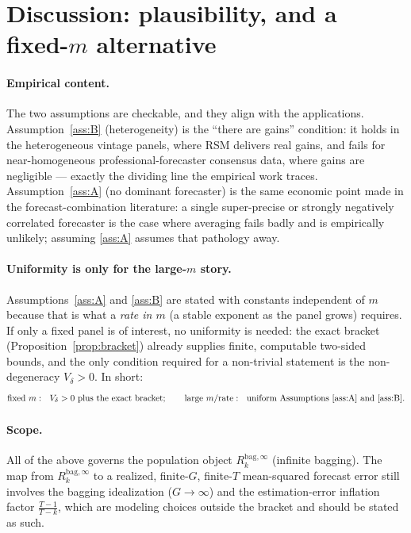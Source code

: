 \documentclass[11pt]{article}
\newcommand{\Rk}{R_k^{\mathrm{bag},\infty}}
\begin{document}
\section{Discussion: plausibility, and a fixed-$m$ alternative}
\paragraph{Empirical content.} The two assumptions are checkable, and they align with the
applications. Assumption~\ref{ass:B} (heterogeneity) is the ``there are gains'' condition:
it holds in the heterogeneous vintage panels, where RSM delivers real gains, and fails for
near-homogeneous professional-forecaster consensus data, where gains are negligible ---
exactly the dividing line the empirical work traces. Assumption~\ref{ass:A} (no dominant
forecaster) is the same economic point made in the forecast-combination literature: a
single super-precise or strongly negatively correlated forecaster is the case where
averaging fails badly and is empirically unlikely; assuming \ref{ass:A} assumes that
pathology away.

\paragraph{Uniformity is only for the large-$m$ story.} Assumptions~\ref{ass:A} and
\ref{ass:B} are stated with constants independent of $m$ because that is what a
\emph{rate in $m$} (a stable exponent as the panel grows) requires. If only a fixed panel
is of interest, no uniformity is needed: the exact bracket
(Proposition~\ref{prop:bracket}) already supplies finite, computable two-sided bounds, and
the only condition required for a non-trivial statement is the non-degeneracy
$V_\delta>0$. In short:
\[
  \text{fixed }m:\ \ V_\delta>0 \text{ plus the exact bracket};\qquad
  \text{large }m / \text{rate}:\ \ \text{uniform Assumptions~\ref{ass:A} and \ref{ass:B}.}
\]

\paragraph{Scope.} All of the above governs the population object $\Rk$ (infinite
bagging). The map from $\Rk$ to a realized, finite-$G$, finite-$T$ mean-squared forecast
error still involves the bagging idealization ($G\to\infty$) and the estimation-error
inflation factor $\frac{T-1}{T-k}$, which are modeling choices outside the bracket and
should be stated as such.
\end{document}
